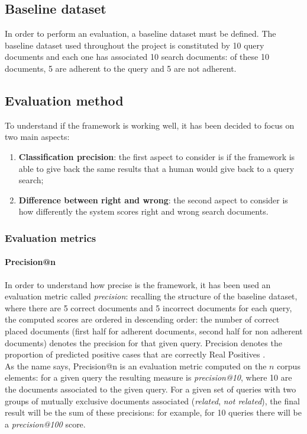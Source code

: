 \documentclass[\main/main.tex]{subfiles}
\begin{document}
\subsection{Baseline dataset}
In order to perform an evaluation, a baseline dataset must be defined. The baseline dataset used throughout the project is constituted by 10 query documents and each one has associated 10 search documents: of these 10 documents, 5 are adherent to the query and 5 are not adherent.
\subsection{Evaluation method}
To understand if the framework is working well, it has been decided to focus on two main aspects:
\begin{enumerate}
    \item \textbf{Classification precision}: the first aspect to consider is if the framework is able to give back the same results that a human would give back to a query search;
    \item \textbf{Difference between right and wrong}: the second aspect to consider is how differently the system scores right and wrong search documents.
\end{enumerate}
\subsubsection{Evaluation metrics}
\paragraph{Precision@n} In order to understand how precise is the framework, it has been used an evaluation metric called \emph{precision}: recalling the structure of the baseline dataset, where there are 5 correct documents and 5 incorrect documents for each query, the computed scores are ordered in descending order: the number of correct placed documents (first half for adherent documents, second half for non adherent documents) denotes the precision for that given query. Precision denotes the proportion of predicted positive cases that are correctly Real Positives \cite{DBLP:journals/corr/abs-2010-16061}.\\
As the name says, Precision@n is an evaluation metric computed on the $n$ corpus elements: for a given query the resulting measure is \emph{precision@10}, where 10 are the documents associated to the given query. For a given set of queries with two groups of mutually exclusive documents associated (\emph{related}, \emph{not related}), the final result will be the sum of these precisions: for example, for 10 queries there will be a \emph{precision@100} score.
\end{document}
